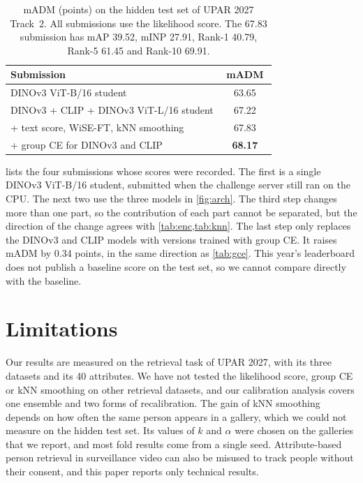 \documentclass[10pt,twocolumn,letterpaper]{article}
\begin{document}
\begin{table}[t]
\centering
\small
\setlength{\tabcolsep}{4pt}
\begin{tabular}{@{}p{0.8\linewidth}c@{}}
\toprule
Submission & mADM \\
\midrule
DINOv3 ViT-B/16 student & 63.65 \\
DINOv3 + CLIP + DINOv3 ViT-L/16 student & 67.22 \\
\quad + text score, WiSE-FT, kNN smoothing & 67.83 \\
\quad + group CE for DINOv3 and CLIP & \textbf{68.17} \\
\bottomrule
\end{tabular}
\caption{mADM (points) on the hidden test set of UPAR 2027 Track~2. All submissions use the likelihood score. The 67.83 submission has mAP 39.52, mINP 27.91, Rank-1 40.79, Rank-5 61.45 and Rank-10 69.91.}
\label{tab:test}
\end{table}

 lists the four submissions whose scores were recorded. The first is a single DINOv3 ViT-B/16 student, submitted when the challenge server still ran on the CPU. The next two use the three models in \cref{fig:arch}. The third step changes more than one part, so the contribution of each part cannot be separated, but the direction of the change agrees with \cref{tab:enc,tab:knn}. The last step only replaces the DINOv3 and CLIP models with versions trained with group CE. It raises mADM by 0.34 points, in the same direction as \cref{tab:gce}. This year's leaderboard does not publish a baseline score on the test set, so we cannot compare directly with the baseline.

\section{Limitations}
\label{sec:limits}

Our results are measured on the retrieval task of UPAR 2027, with its three datasets and its 40 attributes. We have not tested the likelihood score, group CE or kNN smoothing on other retrieval datasets, and our calibration analysis covers one ensemble and two forms of recalibration. The gain of kNN smoothing depends on how often the same person appears in a gallery, which we could not measure on the hidden test set. Its values of $k$ and $\alpha$ were chosen on the galleries that we report, and most fold results come from a single seed. Attribute-based person retrieval in surveillance video can also be misused to track people without their consent, and this paper reports only technical results.
\end{document}
